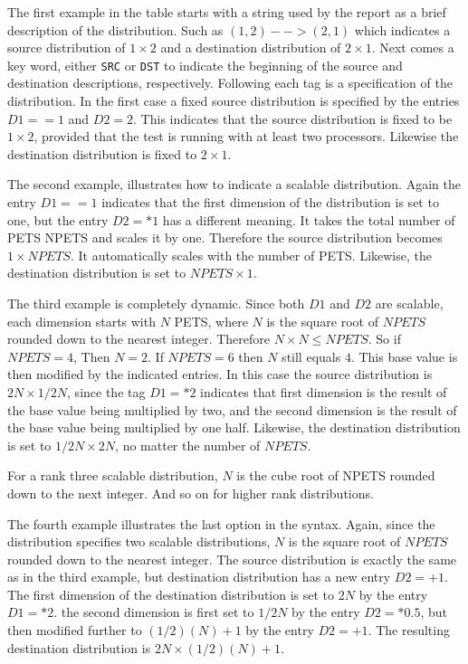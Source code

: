 The first example in the table starts with a string used by the report as a brief description of the distribution. Such as  $(1,2)-->(2,1)$ which indicates a source distribution of $ 1 \times 2$ and a destination distribution of $ 2 \times 1$. Next comes a key word, either \texttt{SRC} or \texttt{DST} to indicate the beginning of the source and destination descriptions, respectively. Following each tag is a specification of the distribution. In the first case a fixed source distribution is specified by the entries $D1==1$ and $D2=2$. This indicates that the source distribution is fixed to be $ 1 \times 2$, provided that the test is running with at least two processors. Likewise the destination distribution is fixed to $ 2 \times 1$.

The second example, illustrates how to indicate a scalable distribution. Again the entry $D1==1$ indicates that the first dimension of the distribution is set to one, but the entry $D2=*1$ has a different meaning. It takes the total number of PETS NPETS and scales it by one. Therefore the source distribution becomes $ 1 \times NPETS$. It automatically scales with the number of PETS. Likewise, the destination distribution is set to $NPETS \times 1$. 

The third example is completely dynamic. Since both $D1$ and $D2$ are scalable, each dimension starts with $N$ PETS, where $N$ is the square root of $NPETS$ rounded down to the nearest integer. Therefore $N\times N \leq NPETS$. So if $NPETS=4$, Then $N=2$. If $NPETS=6$ then $N$ still equals $4$. This base value is then modified by the indicated entries. In this case the source distribution is $2 N \times 1/2 N$, since the tag $D1=*  2$ indicates that first dimension is the result of the base value being multiplied by two, and the second dimension is the result of the base value being multiplied by one half. Likewise, the destination distribution is set to $1/2 N \times 2N$, no matter the number of $NPETS$.

For a rank three scalable distribution, $N$ is the cube root of NPETS rounded down to the next integer. And so on for higher rank distributions. 

The fourth example illustrates the last option in the syntax. Again, since the distribution specifies two scalable distributions, $N$ is the square root of $NPETS$ rounded down to the nearest integer. The source distribution is exactly the same as in the third example, but destination distribution has a new entry $D2=+ 1$. The first dimension of the destination distribution is set to $2N$ by the entry $D1=* 2$. the second dimension is first set to $1/2N$ by the entry $D2=* 0.5$, but then modified further to $(1/2)(N) +1$ by the entry $D2=+ 1$. The resulting destination distribution is $2N \times (1/2)(N) +1$. 

